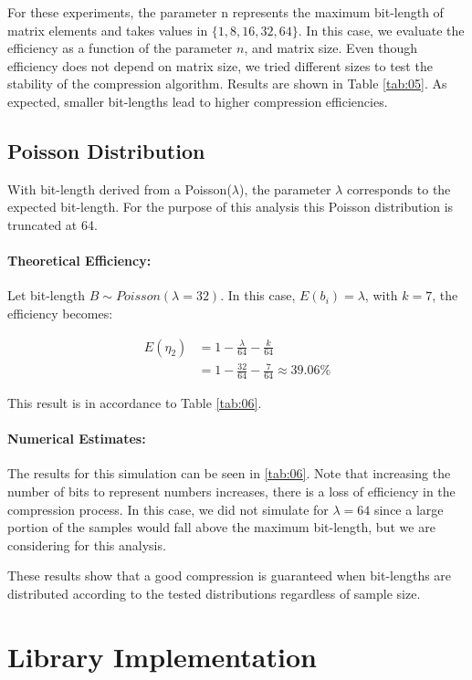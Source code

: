 \documentclass[10pt]{article}
\begin{document}
For these experiments, the parameter n represents the maximum bit-length of 
matrix elements and takes values in $\{1, 8, 16, 32, 64\}$. In this case, we 
evaluate the efficiency as a function of the parameter $n$, and matrix size. 
Even though efficiency does not depend on matrix size, we tried different sizes 
to test the stability of the compression algorithm. Results are shown in Table 
\ref{tab:05}. As expected, smaller bit-lengths lead to higher compression 
efficiencies. 

\subsection*{Poisson Distribution}
With bit-length derived from a Poisson($\lambda$), the parameter $\lambda$ 
corresponds to the expected bit-length. For the purpose of this analysis this 
Poisson distribution is truncated at 64.

\paragraph{Theoretical Efficiency:}
Let bit-length $B \sim Poisson(\lambda=32)$. In this case, $E(b_i) = \lambda$, 
with $k=7$,  the efficiency becomes: 

\begin{align}
 E(\eta_2) &= 1 - \frac{\lambda}{64} - \frac{k}{64} \label{eq:49} \\
 &= 1 - \frac{32}{64} - \frac{7}{64} \approx 39.06\% \label{eq:50}
\end{align}

This result is in accordance to Table \ref{tab:06}.

\paragraph{Numerical Estimates:}
The results for this simulation can be seen in \ref{tab:06}. Note that 
increasing the number of bits to represent numbers increases, there is a loss of 
efficiency in the compression process. In this case, we did not simulate for 
$\lambda=64$ since a large portion of the samples would fall above the maximum 
bit-length, but  we are considering for this 
analysis. 

These results show that a good compression is guaranteed when bit-lengths are 
distributed according to the tested distributions regardless of sample size. 


\section*{Library Implementation }
\end{document}
